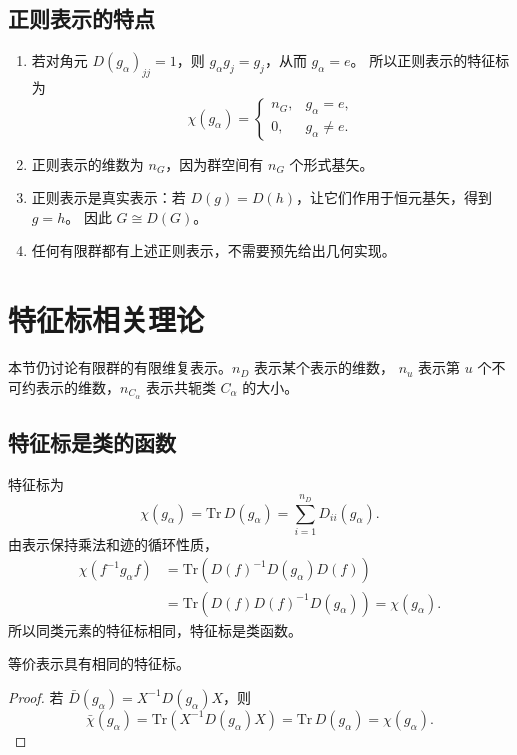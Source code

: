 \subsection{正则表示的特点}
\begin{enumerate}
\item 若对角元 $D\left(g_\alpha\right)_{jj}=1$，则 $g_\alpha g_j=g_j$，从而 $g_\alpha=e$。
所以正则表示的特征标为
\begin{equation}
\chi\left(g_\alpha\right)=\begin{cases}n_G,&g_\alpha=e,\\0,&g_\alpha\ne e.\end{cases}
\end{equation}
\item 正则表示的维数为 $n_G$，因为群空间有 $n_G$ 个形式基矢。
\item 正则表示是真实表示：若 $D\left(g\right)=D\left(h\right)$，让它们作用于恒元基矢，得到 $g=h$。
因此 $G\cong D\left(G\right)$。
\item 任何有限群都有上述正则表示，不需要预先给出几何实现。
\end{enumerate}

\section{特征标相关理论}
本节仍讨论有限群的有限维复表示。$n_D$ 表示某个表示的维数，
$n_u$ 表示第 $u$ 个不可约表示的维数，$n_{C_\alpha}$ 表示共轭类 $C_\alpha$ 的大小。

\subsection{特征标是类的函数}
特征标为
\begin{equation}
\chi\left(g_\alpha\right)=\mathrm{Tr}\,D\left(g_\alpha\right)=\sum_{i=1}^{n_D}D_{ii}\left(g_\alpha\right).
\end{equation}
由表示保持乘法和迹的循环性质，
\begin{align}
\chi\left(f^{-1}g_\alpha f\right)
&=\mathrm{Tr}\left(D\left(f\right)^{-1}D\left(g_\alpha\right)D\left(f\right)\right)\\
&=\mathrm{Tr}\left(D\left(f\right)D\left(f\right)^{-1}D\left(g_\alpha\right)\right)=\chi\left(g_\alpha\right).
\end{align}
所以同类元素的特征标相同，特征标是类函数。

\begin{theorem}[定理 1]
等价表示具有相同的特征标。
\end{theorem}
\begin{proof}
若 $\bar D\left(g_\alpha\right)=X^{-1}D\left(g_\alpha\right)X$，则
\begin{equation}
\bar\chi\left(g_\alpha\right)=\mathrm{Tr}\left(X^{-1}D\left(g_\alpha\right)X\right)
=\mathrm{Tr}\,D\left(g_\alpha\right)=\chi\left(g_\alpha\right).
\end{equation}
\end{proof}


